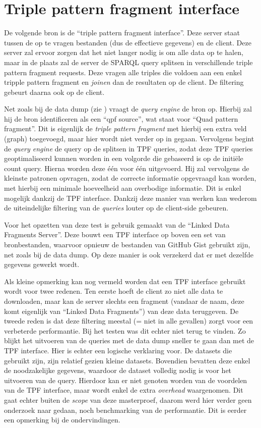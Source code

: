 \section{Triple pattern fragment interface}
\label{sec:impl_tpf_interface}
De volgende bron is de ``triple pattern fragment interface''. Deze server staat tussen de op te vragen bestanden (dus de effectieve gegevens) en de client. Deze server zal ervoor zorgen dat het niet langer nodig is om alle data op te halen, maar in de plaats zal de server de SPARQL query splitsen in verschillende triple pattern fragment requests. Deze vragen alle triples die voldoen aan een enkel tripple pattern fragment en \textit{joinen} dan de resultaten op de client. De filtering gebeurt daarna ook op de client.

Net zoals bij de data dump (zie ) vraagt de \textit{query engine} de bron op. Hierbij zal hij de bron identificeren als een ``qpf source'', wat staat voor ``Quad pattern fragment''. Dit is eigenlijk de \textit{triple pattern fragment} met hierbij een extra veld (graph) toegevoegd, maar hier wordt niet verder op in gegaan. Vervolgens begint de \textit{query engine} de query op de splitsen in TPF queries, zodat deze TPF queries geoptimaliseerd kunnen worden in een volgorde die gebaseerd is op de initiële count query. Hierna worden deze één voor één uitgevoerd. Hij zal vervolgens de kleinste patronen opvragen, zodat de correcte informatie opgevraagd kan worden, met hierbij een minimale hoeveelheid aan overbodige informatie. Dit is enkel mogelijk dankzij de TPF interface. Dankzij deze manier van werken kan wederom de uiteindelijke filtering van de \textit{queries} louter op de client-side gebeuren.

Voor het opzetten van deze test is gebruik gemaakt van de ``Linked Data Fragments Server''. Deze bouwt een TPF interface op boven een set van bronbestanden, waarvoor opnieuw de bestanden van GitHub Gist gebruikt zijn, net zoals bij de data dump. Op deze manier is ook verzekerd dat er met dezelfde gegevens gewerkt wordt. 

Als kleine opmerking kan nog vermeld worden dat een TPF interface gebruikt wordt voor twee redenen. Ten eerste hoeft de client zo niet alle data te downloaden, maar kan de server slechts een fragment (vandaar de naam, deze komt eigenlijk van ``Linked Data Fragments'') van deze data teruggeven. De tweede reden is dat deze filtering meestal (= niet in alle gevallen) zorgt voor een verbeterde performantie. Bij het testen was dit echter niet terug te vinden. Zo blijkt het uitvoeren van de queries met de data dump sneller te gaan dan met de TPF interface. Hier is echter een logische verklaring voor. De datasets die gebruikt zijn, zijn relatief gezien kleine datasets. Bovendien bevatten deze enkel de noodzakelijke gegevens, waardoor de dataset volledig nodig is voor het uitvoeren van de query. Hierdoor kan er niet genoten worden van de voordelen van de TPF interface, maar wordt enkel de extra \textit{overhead} waargenomen. Dit gaat echter buiten de \textit{scope} van deze masterproef, daarom werd hier verder geen onderzoek naar gedaan, noch benchmarking van de performantie. Dit is eerder een opmerking bij de ondervindingen.